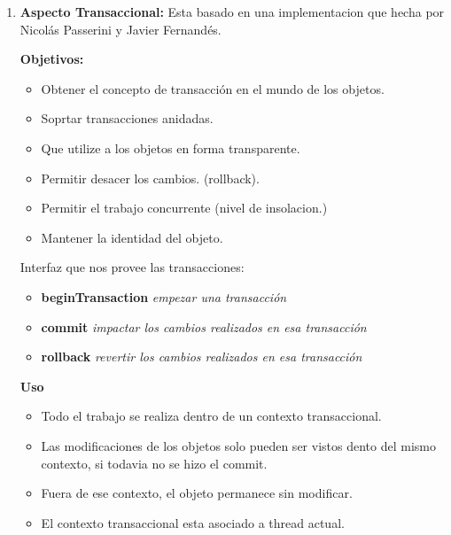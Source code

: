 \begin{enumerate}

	\item {\bf Aspecto Transaccional:} Esta basado en una implementacion que
	hecha por Nicolás Passerini y Javier Fernandés.
	
	{\bf Objetivos:}
	\begin{itemize}

	  \item Obtener el concepto de transacción en el mundo de los objetos.
	  
	  \item Soprtar transacciones anidadas.
	  
	  \item Que utilize a los objetos en forma transparente.
	  
	  \item Permitir desacer los cambios. (rollback).
	  
	  \item Permitir el trabajo concurrente (nivel de insolacion.)
	  
	  \item Mantener la identidad del objeto.
	   
	\end{itemize} 
	
	Interfaz que nos provee las transacciones:
	\begin{itemize}
	  \item {\bf beginTransaction}  \emph{empezar una transacción}
	  \item {\bf commit} \emph{impactar los cambios realizados en esa transacción}
	  \item {\bf rollback} \emph{revertir los cambios realizados en esa
	  transacción}
	\end{itemize}
	
	{\bf Uso}
	\begin{itemize}
	  \item Todo el trabajo se realiza dentro de un contexto transaccional.
	  
	  \item Las modificaciones de los objetos solo pueden ser vistos dento del
	  mismo contexto, si todavia no se hizo el commit.
	   
	  \item Fuera de ese contexto, el objeto permanece sin modificar.
	  
	   \item El contexto transaccional esta asociado a thread actual.
	\end{itemize}
	

\end{enumerate}
